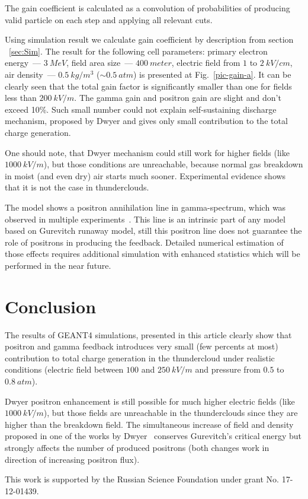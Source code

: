 \documentclass[utf8]{webofc}
\begin{document}
    The gain coefficient is calculated as a convolution of probabilities of producing valid particle on each step and applying all relevant cuts.
    
    Using simulation result we calculate gain coefficient by description from section ~\ref{sec:Sim}. The result for the following cell parameters: primary electron energy~--- $3~MeV$, field area size~--- $400~meter$, electric field from $1$ to $2~kV/cm$, air density~--- $0.5~kg/m^3$ ($\sim 0.5~atm$) is presented at Fig.~\ref{pic-gain-a}. It can be clearly seen that the total gain factor is significantly smaller than one for fields less than $200~kV/m$. The gamma gain and positron gain are slight and don't exceed 10\%. Such small number could not explain self-sustaining discharge mechanism, proposed by Dwyer and gives only small contribution to the total charge generation.
    
    One should note, that Dwyer mechanism could still work for higher fields (like $1000~kV/m$), but those conditions are unreachable, because normal gas breakdown in moist (and even dry) air starts much sooner. Experimental evidence shows that it is not the case in thunderclouds.
    
    The model shows a positron annihilation line in gamma-spectrum, which was observed in multiple experiments~\cite{dwyer2015positron}. This line is an intrinsic part of any model based on Gurevitch runaway model, still this positron line does not guarantee the role of positrons in producing the feedback. Detailed numerical estimation of those effects requires additional simulation with enhanced statistics which will be performed in the near future.
    
    \section{Conclusion}
    
    The results of GEANT4 simulations, presented in this article clearly show that positron and gamma feedback introduces very small (few percents at most) contribution to total charge generation in the thundercloud under realistic conditions (electric field between $100$ and $250~kV/m$ and pressure from $0.5$ to $0.8~atm$). 
    
    Dwyer positron enhancement is still possible for much higher electric fields (like $1000~kV/m$), but those fields are unreachable in the thunderclouds since they are higher than the breakdown field. The simultaneous increase of field and density proposed in one of the works by Dwyer~\cite{dwyer2003fundamental} conserves Gurevitch's critical energy but strongly affects the number of produced positrons (both changes work in direction of increasing positron flux).
    
    This work is supported by the Russian Science Foundation under grant No. 17-12-01439.
    
    {}
\end{document}
